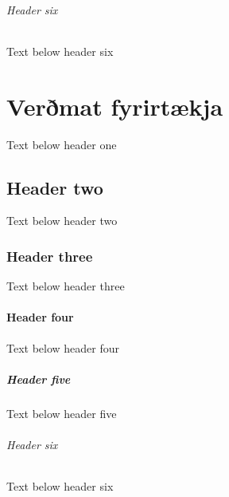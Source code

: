\documentclass[a4paper,10pt,icelandic]{sphinxmanual}
\begin{document}
\subparagraph{Header six}
\label{\detokenize{fjarmagnskostnadur/index:header-six}}
\sphinxAtStartPar
Text below header six

\sphinxstepscope


\chapter{Verðmat fyrirtækja}
\label{\detokenize{verdmat-fyrirtaekja/index:vermat-fyrirtaekja}}\label{\detokenize{verdmat-fyrirtaekja/index::doc}}
\sphinxAtStartPar
Text below header one


\section{Header two}
\label{\detokenize{verdmat-fyrirtaekja/index:header-two}}
\sphinxAtStartPar
Text below header two


\subsection{Header three}
\label{\detokenize{verdmat-fyrirtaekja/index:header-three}}
\sphinxAtStartPar
Text below header three


\subsubsection{Header four}
\label{\detokenize{verdmat-fyrirtaekja/index:header-four}}
\sphinxAtStartPar
Text below header four


\paragraph{Header five}
\label{\detokenize{verdmat-fyrirtaekja/index:header-five}}
\sphinxAtStartPar
Text below header five


\subparagraph{Header six}
\label{\detokenize{verdmat-fyrirtaekja/index:header-six}}
\sphinxAtStartPar
Text below header six



\renewcommand{\indexname}{Yfirlit}
\printindex
\end{document}
